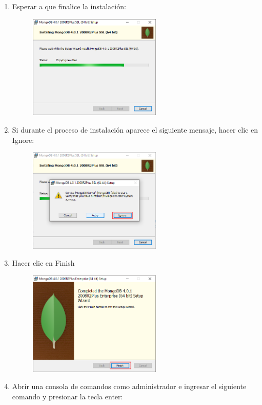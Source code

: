 \documentclass[a4paper,11pt]{paper}
\begin{document}
\begin{enumerate}
\newpage
\item
  Esperar a que finalice la instalación:

  \begin{figure}[!h]
  \centering
  \includegraphics[width=0.6\textwidth]{imgs/instalacion/Paso7.png}
  \end{figure}
\item
  Si durante el proceso de instalación aparece el siguiente mensaje,
  hacer clic en Ignore:

  \begin{figure}[!h]
  \centering
  \includegraphics[width=0.6\textwidth]{imgs/instalacion/Paso8.png}
  \end{figure}

\newpage
\item
  Hacer clic en Finish

  \begin{figure}[!h]
  \centering
  \includegraphics[width=0.6\textwidth]{imgs/instalacion/Paso9.png}
  \end{figure}
\item
  Abrir una consola de comandos como administrador e ingresar el siguiente comando y presionar la tecla enter:


\end{enumerate}
\end{document}
